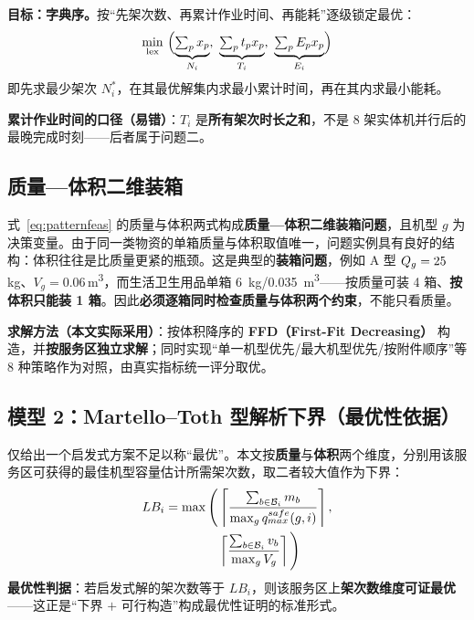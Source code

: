 \textbf{目标：字典序。}按“先架次数、再累计作业时间、再能耗”逐级锁定最优：
\begin{equation}
	\min_{\text{lex}}\ \Bigl(\underbrace{\textstyle\sum_{p}x_{p}}_{N_i},\
	\underbrace{\textstyle\sum_{p}t_{p}x_{p}}_{T_i},\
	\underbrace{\textstyle\sum_{p}E_{p}x_{p}}_{E_i}\Bigr)
	\label{eq:lex}
\end{equation}
即先求最少架次 $N_i^{*}$，在其最优解集内求最小累计时间，再在其内求最小能耗。

\textbf{累计作业时间的口径（易错）}：$T_i$ 是\textbf{所有架次时长之和}，不是 8 架实体机并行后的最晚完成时刻——后者属于问题二。

\subsection{质量—体积二维装箱}

式~\eqref{eq:patternfeas} 的质量与体积两式构成\textbf{质量—体积二维装箱问题}，且机型 $g$ 为决策变量。由于同一类物资的单箱质量与体积取值唯一，问题实例具有良好的结构：体积往往是比质量更紧的瓶颈。这是典型的\textbf{装箱问题}\cite{martello1990binpacking,lodi2002threedim}，例如 A 型 $Q_{g}=25$\,kg、$V_{g}=0.06$\,\si{m^3}，而生活卫生用品单箱 \SI{6}{kg}/\SI{0.035}{m^3}——按质量可装 4 箱、\textbf{按体积只能装 1 箱}。因此\textbf{必须逐箱同时检查质量与体积两个约束}，不能只看质量。

\textbf{求解方法（本文实际采用）}：按体积降序的 \textbf{FFD（First-Fit Decreasing）}\cite{martello1990binpacking,lodi2002threedim} 构造，并\textbf{按服务区独立求解}；同时实现“单一机型优先/最大机型优先/按附件顺序”等 8 种策略作为对照，由真实指标统一评分取优。

\subsection{模型 2：Martello--Toth 型解析下界（最优性依据）}

仅给出一个启发式方案不足以称“最优”。本文按\textbf{质量}与\textbf{体积}两个维度，分别用该服务区可获得的最佳机型容量估计所需架次数，取二者较大值作为下界：
\begin{equation}
	\begin{aligned}
		LB_i=\max\Bigg(&\left\lceil\frac{\sum_{b\in\mathcal{B}_i}m_{b}}{\max_{g}q_{max}^{safe}(g,i)}\right\rceil,\\
		              &\left\lceil\frac{\sum_{b\in\mathcal{B}_i}v_{b}}{\max_{g}V_{g}}\right\rceil\Bigg)
	\end{aligned}
	\label{eq:lb}
\end{equation}
\textbf{最优性判据}：若启发式解的架次数等于 $LB_i$，则该服务区上\textbf{架次数维度可证最优}——这正是“下界 $+$ 可行构造”构成最优性证明的标准形式。


